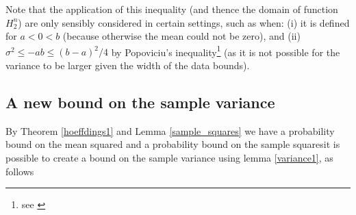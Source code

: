 Note that the application of this inequality (and thence the domain of function $H_2^n$) are only sensibly considered in certain settings, such as when:
(i) it is defined for $a<0<b$ (because otherwise the mean could not be zero), and (ii) $\sigma^2\le-ab\le (b-a)^2/4$ by Popoviciu's inequality\footnote{see \cite{zbMATH05780164}} (as it is not possible for the variance to be larger given the width of the data bounds).



\subsection{A new bound on the sample variance}\label{subsection:sample_variance_bound}

By Theorem \ref{hoeffdings1} and Lemma \ref{sample_squares} we have a probability bound on the mean squared and a probability bound on the sample squares\DIFdelbegin {}\DIFdelend \DIFaddbegin {}\DIFaddend it is possible to create \DIFaddbegin {}\DIFaddend a bound on the sample variance using lemma \ref{variance1}, as follows\DIFdelbegin {}\DIFdelend \DIFaddbegin \DIFadd{:
}\DIFaddend 


